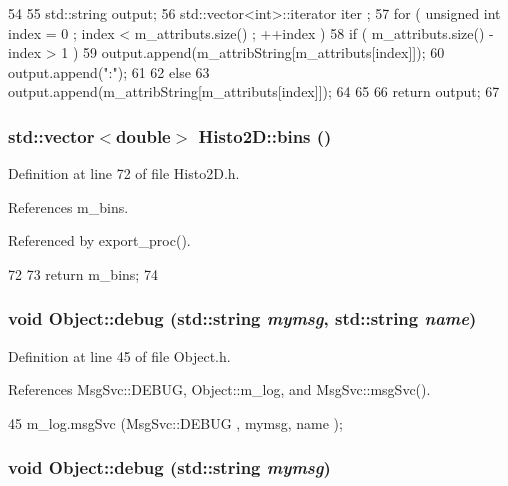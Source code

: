\begin{DoxyCode}
54                             {
55   std::string output;
56   std::vector<int>::iterator iter ;
57   for ( unsigned int index = 0 ; index < m_attributs.size() ; ++index ) {
58     if ( m_attributs.size() - index > 1 ) {
59       output.append(m_attribString[m_attributs[index]]);
60       output.append(":");
61     }
62     else {
63       output.append(m_attribString[m_attributs[index]]);
64     }
65   }
66   return output;
67 }
\end{DoxyCode}
\hypertarget{classHisto2D_ab3d44a1cb12119a2244065af2b1f7099}{
\subsubsection[{bins}]{\setlength{\rightskip}{0pt plus 5cm}std::vector$<$double$>$ Histo2D::bins ()}}
\label{classHisto2D_ab3d44a1cb12119a2244065af2b1f7099}


Definition at line 72 of file Histo2D.h.

References m\_\-bins.

Referenced by export\_\-proc().


\begin{DoxyCode}
72                           {  
73     return m_bins;
74   }
\end{DoxyCode}
\hypertarget{classObject_a6c9a0397ca804e04d675ed05683f5420}{
\subsubsection[{debug}]{\setlength{\rightskip}{0pt plus 5cm}void Object::debug (std::string {\em mymsg}, \/  std::string {\em name})}}
\label{classObject_a6c9a0397ca804e04d675ed05683f5420}


Definition at line 45 of file Object.h.

References MsgSvc::DEBUG, Object::m\_\-log, and MsgSvc::msgSvc().


\begin{DoxyCode}
45 { m_log.msgSvc (MsgSvc::DEBUG   , mymsg, name ); }
\end{DoxyCode}
\hypertarget{classObject_aac010553f022165573714b7014a15f0d}{
\subsubsection[{debug}]{\setlength{\rightskip}{0pt plus 5cm}void Object::debug (std::string {\em mymsg})}}
\label{classObject_aac010553f022165573714b7014a15f0d}


